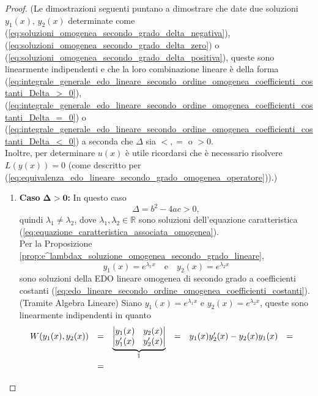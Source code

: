 \begin{proof}
	(Le dimostrazioni seguenti puntano a dimostrare che date due soluzioni $y_1(x),\, y_2(x)$ determinate come (\ref{eq:soluzioni_omogenea_secondo_grado_delta_negativa}), (\ref{eq:soluzioni_omogenea_secondo_grado_delta_zero}) o  (\ref{eq:soluzioni_omogenea_secondo_grado_delta_positiva}), queste sono linearmente indipendenti e che la loro combinazione lineare è della forma (\ref{eq:integrale_generale_edo_lineare_secondo_ordine_omogenea_coefficienti_costanti_Delta_>_0}), (\ref{eq:integrale_generale_edo_lineare_secondo_ordine_omogenea_coefficienti_costanti_Delta_=_0}) o (\ref{eq:integrale_generale_edo_lineare_secondo_ordine_omogenea_coefficienti_costanti_Delta_<_0}) a seconda che $\Delta$ sia $<,=$ o $>0$.\\
	Inoltre, per determinare $u(x)$ è utile ricordarsi che è necessario risolvere $L(y(x))=0$ (come descritto per (\ref{eq:equivalenza_edo_lineare_secondo_grado_omogenea_operatore})).)
	\begin{enumerate}
		\item \textbf{Caso} $\boldsymbol{\Delta>0}$\textbf{:} In questo caso
		\begin{equation*}
			\Delta = b^2-4ac>0,
		\end{equation*}
		quindi $\lambda_1\neq \lambda_2$, dove $\lambda_1,\lambda_2\in\mathbb{R}$ sono soluzioni dell'equazione caratteristica (\ref{eq:equazione_caratteristica_associata_omogenea}).\\
			Per la Proposizione \ref{prop:e^lambdax_soluzione_omogenea_secondo_grado_lineare},
		\begin{equation*}
			y_1(x) = e^{\lambda_1 x}\quad\text{e}\quad y_2(x) = e^{\lambda_2 x}
		\end{equation*}
		sono soluzioni della EDO lineare omogenea di secondo grado a coefficienti costanti (\ref{eq:edo_lineare_secondo_ordine_omogenea_coefficienti_costanti}).\\
		\footnotemark (Tramite Algebra Lineare) Siano $y_1(x) = e^{\lambda_1 x}$ e $y_2(x) = e^{\lambda_2 x}$, queste sono linearmente indipendenti in quanto
		\begin{equation*}
			\begin{matrix}
				W(y_1(x),y_2(x)) &=& \underbrace{\begin{vmatrix}
						y_1(x) & y_2(x)\\
						y_1'(x) & y_2'(x)
				\end{vmatrix}}_{\footnotemark} &=& y_1(x)y_2'(x) - y_2(x)y_1(x) &=&\\
				&=&

\end{matrix}
\end{equation*}
\end{enumerate}
\end{proof}
